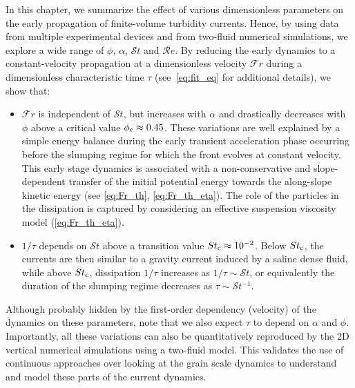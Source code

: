 \documentclass[12pt]{article}
\begin{document}
In this chapter, we summarize the effect of various dimensionless parameters on the early propagation of finite-volume turbidity currents. Hence, by using data from multiple experimental devices and from two-fluid numerical simulations, we explore a wide range of $\phi$, $\alpha$, $\mathcal{S}t$ and $\mathcal{R}e$.
%
By reducing the early dynamics to a constant-velocity propagation at a dimensionless velocity $\mathcal{F}r$ during a dimensionless characteristic time $\tau$ (see~\eqref{eq:fit_eq} for additional details), we show that:
\begin{itemize}
	\item $\mathcal{F}r$ is independent of $\mathcal{S}t$, but increases with $\alpha$ and drastically decreases with $\phi$ above a critical value $\phi_{\text c} \approx 0.45$. These variations are well explained by a simple energy balance during the early transient acceleration phase occurring before the slumping regime for which the front evolves at constant velocity. This early stage dynamics is associated with a non-conservative and slope-dependent transfer of the initial potential energy towards the along-slope kinetic energy (see \eqref{eq:Fr_th}, \eqref{eq:Fr_th_eta}). The role of the particles in the dissipation is captured by considering an effective suspension viscosity model (\eqref{eq:Fr_th_eta}).

	\item $1/\tau$ depends on $\mathcal{S}t$ above a transition value $St_{\text c} \approx 10^{-2}$. Below $St_{\text c}$, the currents are then similar to a gravity current induced by a saline dense fluid, while above $St_{\text c}$, dissipation $1/\tau$ increases as $1/\tau \sim \mathcal{S}t$, or equivalently the duration of the slumping regime decreases as $\tau \sim \mathcal{S}t^{-1}$.
\end{itemize}
Although probably hidden by the first-order dependency (velocity) of the dynamics on these parameters, note that we also expect $\tau$ to depend on $\alpha$ and $\phi$.
%
Importantly, all these variations can also be quantitatively reproduced by the 2D vertical numerical simulations using a two-fluid model. This validates the use of continuous approaches over looking at the grain scale dynamics to understand and model these parts of the current dynamics.

\end{document}
